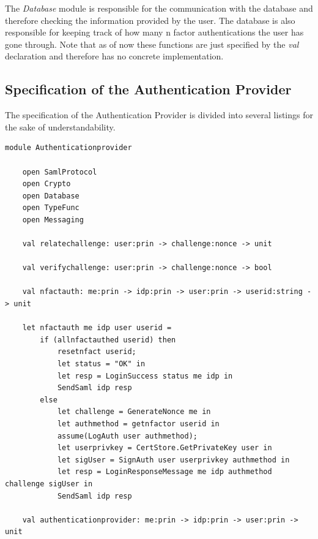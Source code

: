 \documentclass[twosided]{report}
\begin{document}
The \emph{Database} module is responsible for the communication with the database and therefore checking the information provided by the user. The database is also responsible for keeping track of how many n factor authentications the user has gone through. Note that as of now these functions are just specified by the \emph{val} declaration and therefore has no concrete implementation.
\subsection{Specification of the Authentication Provider}
The specification of the Authentication Provider is divided into several listings for the sake of understandability.

\begin{lstlisting}[style=fstar, caption={Specification of the authentication provider}]
	module Authenticationprovider

	open SamlProtocol
	open Crypto
	open Database
	open TypeFunc
	open Messaging

	val relatechallenge: user:prin -> challenge:nonce -> unit

	val verifychallenge: user:prin -> challenge:nonce -> bool

	val nfactauth: me:prin -> idp:prin -> user:prin -> userid:string -> unit

	let nfactauth me idp user userid =
		if (allnfactauthed userid) then
			resetnfact userid;
			let status = "OK" in
			let resp = LoginSuccess status me idp in
			SendSaml idp resp
		else
			let challenge = GenerateNonce me in
			let authmethod = getnfactor userid in
			assume(LogAuth user authmethod);
			let userprivkey = CertStore.GetPrivateKey user in
			let sigUser = SignAuth user userprivkey authmethod in
			let resp = LoginResponseMessage me idp authmethod challenge sigUser in
			SendSaml idp resp

	val authenticationprovider: me:prin -> idp:prin -> user:prin -> unit


\end{lstlisting}
\end{document}
